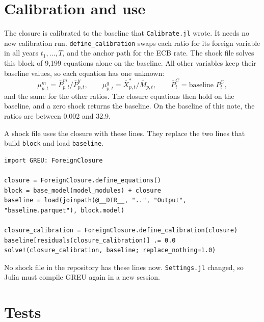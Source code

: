 \documentclass[11pt,a4paper]{article}
\newcommand{\code}[1]{\texttt{#1}}
\begin{document}
\section{Calibration and use}

The closure is calibrated to the baseline that \code{Calibrate.jl} wrote. It needs no new calibration run.
\code{define\_calibration} swaps each ratio for its foreign variable in all years $t_1,\dots,T$, and the anchor path for the ECB rate.
The shock file solves this block of 9{,}199 equations alone on the baseline. All other variables keep their baseline values, so each equation has one unknown:
\[
\mu^{m}_{p,t} = \bar{P}^{m}_{p,t} / \bar{P}^{y}_{p,t} , \qquad
\mu^{q}_{p,t} = \bar{X}^{*}_{p,t} / \bar{M}_{p,t} , \qquad
\bar{P}^{C}_{t} = \text{baseline } P^{C}_{t} ,
\]
and the same for the other ratios.
The closure equations then hold on the baseline, and a zero shock returns the baseline.
On the baseline of this note, the ratios are between 0.002 and 32.9.

A shock file uses the closure with these lines. They replace the two lines that build \code{block} and load \code{baseline}.
{\small
\begin{verbatim}
import GREU: ForeignClosure

closure = ForeignClosure.define_equations()
block = base_model(model_modules) + closure
baseline = load(joinpath(@__DIR__, "..", "Output", "baseline.parquet"), block.model)

closure_calibration = ForeignClosure.define_calibration(closure)
baseline[residuals(closure_calibration)] .= 0.0
solve!(closure_calibration, baseline; replace_nothing=1.0)
\end{verbatim}
}
No shock file in the repository has these lines now. \code{Settings.jl} changed, so Julia must compile GREU again in a new session.

\section{Tests}
\label{sec:tests}
\end{document}
